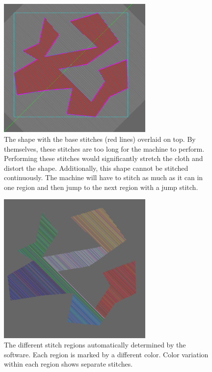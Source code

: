 \documentclass{article}
\begin{document}
\begin{figure}[H]
    \centering
    \includegraphics[width=3in]{p3}
    \caption{The shape with the base stitches (red lines) overlaid on top. By themselves, these stitches are too long for the machine to perform. Performing these stitches would significantly stretch the cloth and distort the shape. Additionally, this shape cannot be stitched continuously. The machine will have to stitch as much as it can in one region and then jump to the next region with a jump stitch.}
    \label{p3}
\end{figure}

\begin{figure}[H]
    \centering
    \includegraphics[width=3in]{p4}
    \caption{The different stitch regions automatically determined by the software. Each region is marked by a different color. Color variation within each region shows separate stitches.}
    \label{p4}
\end{figure}
\end{document}
